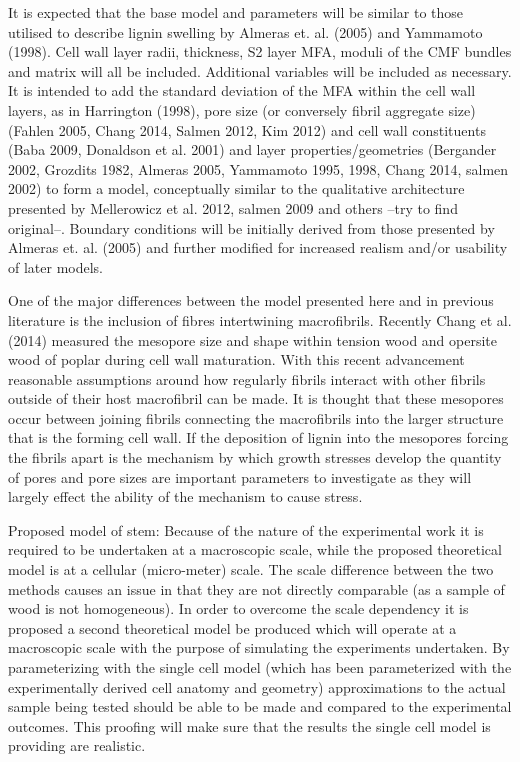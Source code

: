 \documentclass{article}
\begin{document}
It is expected that the base model and parameters will be similar to those
utilised to describe lignin swelling by Almeras  et. al. (2005) and Yammamoto
(1998). Cell wall layer radii, thickness, S2 layer MFA, moduli of the CMF
bundles and matrix will all be included. Additional variables will be included
as necessary. It is intended to add the standard deviation of the MFA within the
cell wall layers, as in Harrington (1998), pore size (or conversely fibril
aggregate size) (Fahlen 2005, Chang 2014, Salmen 2012, Kim 2012) and cell wall
constituents (Baba 2009, Donaldson et al. 2001) and layer properties/geometries
(Bergander 2002, Grozdits 1982, Almeras 2005, Yammamoto 1995, 1998, Chang 2014,
salmen 2002) to form a model, conceptually similar to the qualitative
architecture presented by Mellerowicz et al. 2012, salmen 2009 and others --try
to find original--. Boundary conditions will be initially derived from those
presented by Almeras et. al. (2005) and further modified for increased realism
and/or usability of later models.

One of the major differences between the model presented here and in previous
literature is the inclusion of fibres intertwining macrofibrils. Recently Chang
et al. (2014) measured the mesopore size and shape within tension wood and
opersite wood of poplar during cell wall maturation. With this recent
advancement reasonable assumptions around how regularly fibrils interact with
other fibrils outside of their host macrofibril can be made. It is thought that
these mesopores occur between joining fibrils connecting the macrofibrils into
the larger structure that is the forming cell wall. If the deposition of lignin
into the mesopores forcing the fibrils apart is the mechanism by which growth
stresses develop the quantity of pores and pore sizes are important parameters
to investigate as they will largely effect the ability of the mechanism to cause
stress.

Proposed model of stem:
Because of the nature of the experimental work it is required to be undertaken
at a macroscopic scale, while the proposed theoretical model is at a cellular
(micro-meter) scale. The scale difference between the two methods causes an
issue in that they are not directly comparable (as a sample of wood is not
homogeneous). In order to overcome the scale dependency it is proposed a second
theoretical model be produced which will operate at a macroscopic scale with the
purpose of simulating the experiments undertaken. By parameterizing with the
single cell model (which has been parameterized with the experimentally derived
cell anatomy and geometry) approximations to the actual sample being tested
should be able to be made and compared to the experimental outcomes. This
proofing will make sure that the results the single cell model is providing are
realistic.
\end{document}
